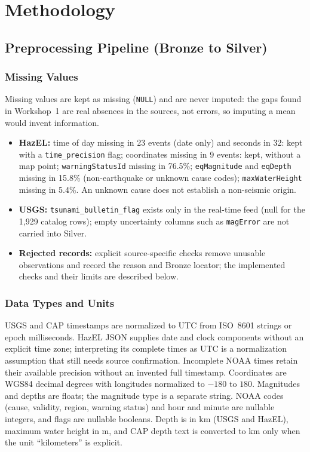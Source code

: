 \documentclass[a4paper,11pt,oneside]{book}
\begin{document}
\chapter{Methodology}
\label{ch:methodology}

\section{Preprocessing Pipeline (Bronze to Silver)}
\subsection{Missing Values}
Missing values are kept as missing (\texttt{NULL}) and are never imputed: the gaps found in Workshop~1 are real absences in the sources, not errors, so imputing a mean would invent information.
\begin{itemize}[nosep]
  \item \textbf{HazEL:} time of day missing in 23 events (date only) and seconds in 32: kept with a \texttt{time\_precision} flag; coordinates missing in 9 events: kept, without a map point; \texttt{warningStatusId} missing in 76.5\%; \texttt{eqMagnitude} and \texttt{eqDepth} missing in 15.8\% (non-earthquake or unknown cause codes); \texttt{maxWaterHeight} missing in 5.4\%. An unknown cause does not establish a non-seismic origin.
  \item \textbf{USGS:} \texttt{tsunami\_bulletin\_flag} exists only in the real-time feed (null for the 1,929 catalog rows); empty uncertainty columns such as \texttt{magError} are not carried into Silver.
  \item \textbf{Rejected records:} explicit source-specific checks remove unusable observations and record the reason and Bronze locator; the implemented checks and their limits are described below.
\end{itemize}
\subsection{Data Types and Units}
USGS and CAP timestamps are normalized to UTC from ISO~8601 strings or epoch milliseconds. HazEL JSON supplies date and clock components without an explicit time zone; interpreting its complete times as UTC is a normalization assumption that still needs source confirmation. Incomplete NOAA times retain their available precision without an invented full timestamp.
Coordinates are WGS84 decimal degrees with longitudes normalized to $-180$ to $180$.
Magnitudes and depths are floats; the magnitude type is a separate string.
NOAA codes (cause, validity, region, warning status) and hour and minute are nullable integers, and flags are nullable booleans.
Depth is in km (USGS and HazEL), maximum water height in m, and CAP depth text is converted to km only when the unit ``kilometers'' is explicit.
\end{document}
